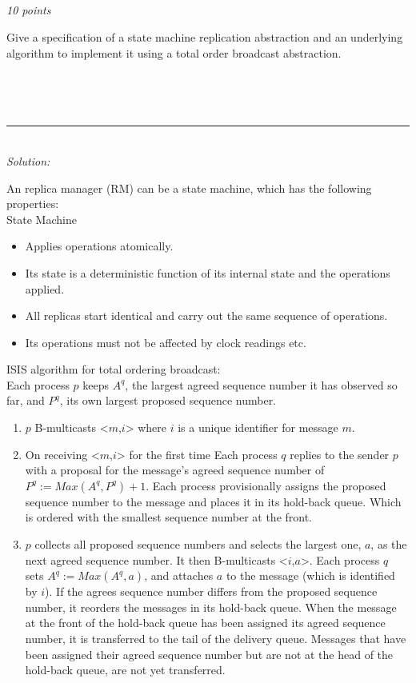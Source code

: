 \documentclass[a4paper]{article}
\newcommand{\horrule}[1]{\rule{\linewidth}{#1}} %
\newcommand{\oklarhet}[1]{%
  \noindent\fbox{\parbox[b][4em][t]{\textwidth}{\color{red}#1} }%
}
\newcommand{\points}[1]{\subsection{} \textit{#1 points}\\}
\newcommand{\question}[2][]{
  \noindent
  \parbox[t]{\textwidth}{#1 \parbox[t]{0.95\textwidth}{#2}}\\
}
\newcommand{\solution}[1]{\\\horrule{0.5pt}\\[3pt]\textit{Solution: }\\[0.1cm]\begin{minipage}{\textwidth}#1\end{minipage}}
\begin{document}
\points{10}
\question{
  Give a specification of a state machine replication abstraction and
  an underlying algorithm to implement it using a total order broadcast
  abstraction.
}
\oklarhet{Bad formulation of the question?}
\solution{
  An replica manager (RM) can be a state machine, which has the
  following properties:\\
  State Machine
  \begin{itemize}
    \item Applies operations atomically.
    \item Its state is a deterministic function of its internal state
      and the operations applied.
    \item All replicas start identical and carry out the same sequence
      of operations.
    \item Its operations must not be affected by clock readings etc.
  \end{itemize}

  ISIS algorithm for total ordering broadcast:\\
  Each process $p$ keeps $A^q$, the largest agreed sequence number it
  has observed so far, and $P^q$, its own largest proposed sequence
  number.
  \begin{enumerate}
    \item $p$ B-multicasts <$m$,$i$> where $i$ is a unique identifier
      for message $m$.
    \item On receiving <$m$,$i$> for the first time
      Each process $q$ replies to the sender $p$ with a proposal
      for the message's agreed sequence number of $P^q := Max(A^q,
      P^q)+1$. Each process provisionally assigns the proposed
      sequence number to the message and places it in its hold-back
      queue. Which is ordered with the smallest sequence number at the front.
    \item $p$ collects all proposed sequence numbers and selects the
      largest one, $a$, as the next agreed sequence number. It then
      B-multicasts <$i$,$a$>. Each process $q$ sets $A^q := Max(A^q,
      a)$, and attaches $a$ to the message (which is identified by
      $i$). If the agrees sequence number differs from the proposed
      sequence number, it reorders the messages in its hold-back
      queue. When the message at the front of the hold-back queue has
      been assigned its agreed sequence number, it is transferred to
      the tail of the delivery queue. Messages that have been assigned
      their agreed sequence number but are not at the head of the
      hold-back queue, are not yet transferred.
  \end{enumerate}

}
\end{document}
